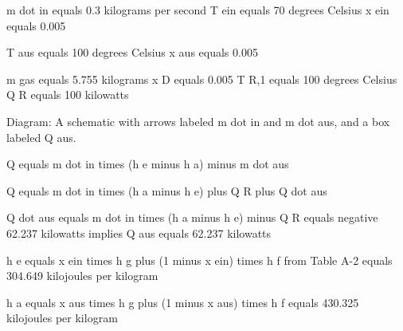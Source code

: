m dot in equals 0.3 kilograms per second  
T ein equals 70 degrees Celsius  
x ein equals 0.005  

T aus equals 100 degrees Celsius  
x aus equals 0.005  

m gas equals 5.755 kilograms  
x D equals 0.005  
T R,1 equals 100 degrees Celsius  
Q R equals 100 kilowatts  

Diagram: A schematic with arrows labeled m dot in and m dot aus, and a box labeled Q aus.  

Q equals m dot in times (h e minus h a) minus m dot aus  

Q equals m dot in times (h a minus h e) plus Q R plus Q dot aus  

Q dot aus equals m dot in times (h a minus h e) minus Q R equals negative 62.237 kilowatts implies Q aus equals 62.237 kilowatts  

h e equals x ein times h g plus (1 minus x ein) times h f from Table A-2  
equals 304.649 kilojoules per kilogram  

h a equals x aus times h g plus (1 minus x aus) times h f  
equals 430.325 kilojoules per kilogram